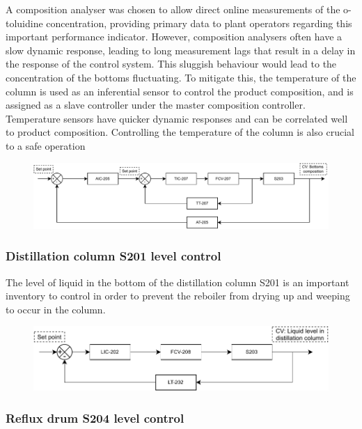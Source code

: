 A composition analyser was chosen to allow direct online measurements of the o-toluidine concentration, providing primary data to plant operators regarding this important performance indicator. However, composition analysers often have a slow dynamic response, leading to long measurement lags that result in a delay in the response of the control system. This sluggish behaviour would lead to the concentration of the bottoms fluctuating. To mitigate this, the temperature of the column is used as an inferential sensor to control the product composition, and is assigned as a slave controller under the master composition controller. Temperature sensors have quicker dynamic responses and can be correlated well to product composition. Controlling the temperature of the column is also crucial to a safe operation 
\begin{figure}[H]
    \centering
    \includegraphics[width=\linewidth]{chapters/4-operation-control/4-Figures/S203-CC.pdf}
    \caption{}
    \label{fig:S203-CC}
\end{figure}


\subsubsection{Distillation column S201 level control}
The level of liquid in the bottom of the distillation column S201 is an important inventory to control in order to prevent the reboiler from drying up and weeping to occur in the column. 
\begin{figure}[H]
    \centering
    \includegraphics[width=\linewidth]{chapters/4-operation-control/4-Figures/S203-LC.pdf}
    \caption{}
    \label{fig:S203-LC}
\end{figure}

\subsubsection{Reflux drum S204 level control}

